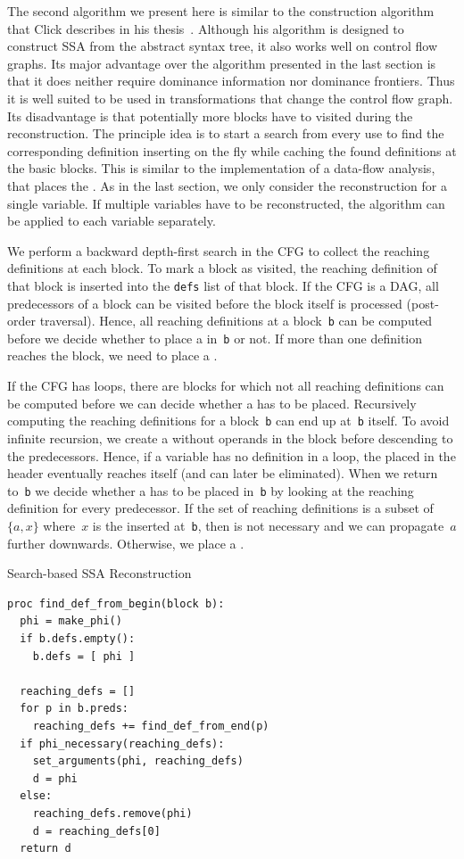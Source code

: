 The second algorithm we present here is similar to the construction algorithm that Click describes in his thesis~\cite{click:thesis}.
Although his algorithm is designed to construct SSA from the abstract syntax tree, it also works well on control flow graphs.
Its major advantage over the algorithm presented in the last section is that it does neither require dominance information nor dominance frontiers.
Thus it is well suited to be used in transformations that change the control flow graph.
Its disadvantage is that potentially more blocks have to visited during the reconstruction.
The principle idea is to start a search from every use to find the corresponding definition inserting \phifuns on the fly while caching the found definitions at the basic blocks.
This is similar to the implementation of a data-flow analysis, that places the \phifuns.
As in the last section, we only consider the reconstruction for a single variable.
If multiple variables have to be reconstructed, the algorithm can be applied to each variable separately.

We perform a backward depth-first search in the CFG to collect the reaching definitions at each block. 
To mark a block as visited, the reaching definition of that block is inserted into the \verb|defs| list of that block.
If the CFG is a DAG, all predecessors of a block can be visited before the block itself is processed (post-order traversal).
Hence, all reaching definitions at a block~\verb|b| can be computed before we decide whether to place a \phifun in~\verb|b| or not.
If more than one definition reaches the block, we need to place a \phifun.

If the CFG has loops, there are blocks for which not all reaching definitions can be computed before we can decide whether a \phifun has to be placed.
Recursively computing the reaching definitions for a block~\verb|b| can end up at~\verb|b| itself.
To avoid infinite recursion, we create a \phifun without operands in the block before descending to the predecessors. 
Hence, if a variable has no definition in a loop, the \phifun placed in the header eventually reaches itself (and can later be eliminated). 
When we return to~\verb|b| we decide whether a \phifun has to be placed in~\verb|b| by looking at the reaching definition for every predecessor.
If the set of reaching definitions is a subset of $\{a,x\}$ where~$x$ is the \phifun inserted at~\verb|b|, then \phifun is not necessary and we can propagate~$a$ further downwards. 
Otherwise, we place a \phifun.

\begin{algorithm}
	\caption{Search-based SSA Reconstruction}
	\label{alg:ssaconstr_click}

\begin{verbatim}
proc find_def_from_begin(block b):
  phi = make_phi()
  if b.defs.empty():
    b.defs = [ phi ] 

  reaching_defs = []
  for p in b.preds:
    reaching_defs += find_def_from_end(p)
  if phi_necessary(reaching_defs):
    set_arguments(phi, reaching_defs)
    d = phi
  else:
    reaching_defs.remove(phi)
    d = reaching_defs[0]
  return d
\end{verbatim}
\end{algorithm}

